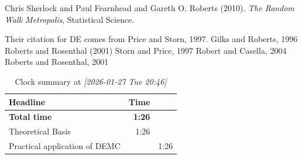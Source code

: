 \documentclass[a4paper]{article}
\begin{document}
\noindent
Chris Sherlock and Paul Fearnhead and Gareth O. Roberts (2010). \emph{The Random Walk Metropolis}, Statistical Science.

Their citation for DE  comes from Price and Storn, 1997. 
Gilks and Roberts, 1996
Roberts and Rosenthal (2001)
Storn and Price, 1997 
Robert and Casella, 2004 
Roberts and Rosenthal, 2001 

\begin{table}[htbp]
\caption{Clock summary at \textit{{[}2026-01-27 Tue 20:46]}}
\centering
\begin{tabular}{lrl}
Headline & Time & \\
\hline
\textbf{Total time} & \textbf{1:26} & \\
\hline
Theoretical Basis & 1:26 & \\
\hspace*{1.0em}Practical application of DEMC &  & 1:26\\
\end{tabular}
\end{table}
\end{document}
